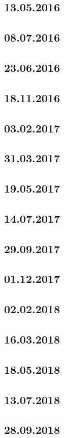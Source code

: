 \documentclass[a4paper,12p]{article}
\begin{document}
	\subsection{13.05.2016}
	\subsection{08.07.2016}
	\subsection{23.06.2016}
	\subsection{18.11.2016}
	\subsection{03.02.2017}
	\subsection{31.03.2017}
	\subsection{19.05.2017}
	\subsection{14.07.2017}
	\subsection{29.09.2017}
	\subsection{01.12.2017}
	\subsection{02.02.2018}
	\subsection{16.03.2018}
	\subsection{18.05.2018}
	\subsection{13.07.2018}
	\subsection{28.09.2018}
\end{document}
